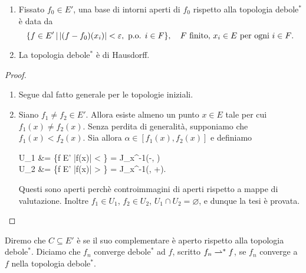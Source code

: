 \begin{lemma}
	\leavevmode
	\begin{enumerate}
		\item Fissato $f_0 \in E'$, una base di intorni aperti di $f_0$ rispetto alla topologia debole$^*$ è data da
		\begin{equation*}
			\{f \in E' \,|\, |(f-f_0)(x_i)| < \varepsilon, \text{ p.o. $i \in F$}\}, \quad \text{$F$ finito, $x_i \in E$ per ogni $i \in F$.}
		\end{equation*}
		\item La topologia debole$^*$ è di Hausdorff.
	\end{enumerate}
\end{lemma}
\begin{proof}
	\leavevmode
	\begin{enumerate}
		\item Segue dal fatto generale per le topologie iniziali.
		\item Siano $f_1 \neq f_2 \in E'$. Allora esiste almeno un punto $x \in E$ tale per cui $f_1(x) \neq f_2(x)$. Senza perdita di generalità, supponiamo che $f_1(x) < f_2(x)$. Sia allora $\alpha \in [f_1(x), f_2(x)]$ e definiamo
		\begin{eqalign*}
			U_1 &= \{f \in E' \suchthat |f(x)| < \alpha\} = J_x^{-1}(-\infty, \alpha)\\
			U_2 &= \{f \in E' \suchthat |f(x)| > \alpha\} = J_x^{-1}(\alpha, +\infty).
		\end{eqalign*}
		Questi sono aperti perchè controimmagini di aperti rispetto a mappe di valutazione. Inoltre $f_1 \in U_1$, $f_2 \in U_2$, $U_1 \cap U_2 = \varnothing$, e dunque la tesi è provata.
	\end{enumerate}
\end{proof}

Diremo che $C \subseteq E'$ è  se il suo complementare è aperto rispetto alla topologia debole$^*$.
Diciamo che $f_n$ converge debole$^*$ ad $f$, scritto $f_n \rightharpoonup^* f$, se $f_n$ converge a $f$ nella topologia debole$^*$.

